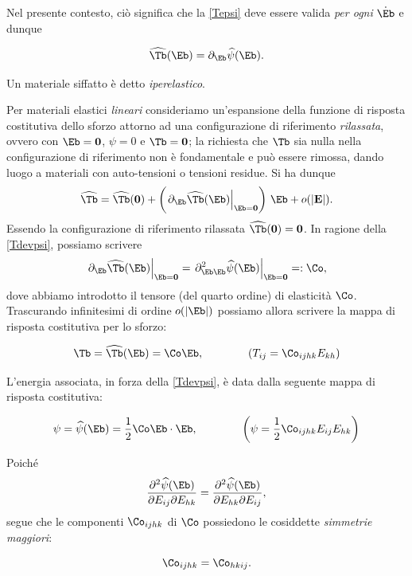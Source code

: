 Nel presente contesto, ciò significa che la \eqref{Tepsi} deve essere valida \textit{per ogni} $\dot{\Eb}$ e dunque 
\begin{definition}
	\begin{equation}\label{Tdevpsi}
\widehat{\Tb}(\Eb)=\partial_\Eb\widehat{\psi}(\Eb).
\end{equation}
\end{definition}
Un materiale siffatto è detto \textit{iperelastico}.

Per materiali elastici \textit{lineari} consideriamo un'espansione della funzione di risposta costitutiva dello sforzo attorno ad una configurazione di riferimento \textit{rilassata}, ovvero con $\Eb=\mathbf{0}$, $\psi=0$ e $\Tb=\mathbf{0}$; la richiesta che $\Tb$ sia nulla nella configurazione di riferimento non è fondamentale e può essere rimossa, dando luogo a materiali con auto-tensioni o tensioni residue. Si ha dunque
\begin{equation}
\widehat{\Tb}=\widehat{\Tb}(\mathbf{0})+\left(\left.\partial_\Eb\widehat{\Tb}(\Eb)\right|_{\Eb=\mathbf{0}}\right)\,\Eb +o(|\mathbf{E}|).
\end{equation}
Essendo la configurazione di riferimento rilassata $\widehat{\Tb}(\mathbf{0})=\mathbf{0}$. In ragione della \eqref{Tdevpsi}, possiamo scrivere
\begin{equation}
\left.\partial_\Eb\widehat{\Tb}(\Eb)\right|_{\Eb=\mathbf{0}}=\left.\partial^2_{\Eb \Eb}\widehat{\psi}(\Eb)\right|_{\Eb=\mathbf{0}}=:\Co,
\end{equation}
dove abbiamo introdotto il tensore (del quarto ordine) di elasticità $\Co$. Trascurando infinitesimi di ordine $o(|\Eb|)$ possiamo allora scrivere la mappa di risposta costitutiva per lo sforzo:
\begin{definition}
	\begin{equation}
\Tb =\widehat{\Tb}(\Eb)=\Co \Eb, \qquad \qquad(T_{ij}=\Co_{ijhk}E_{kh})
\end{equation}
\end{definition}
L'energia associata, in forza della  \eqref{Tdevpsi}, è data dalla seguente mappa di risposta costitutiva:
\begin{definition}
	\begin{equation}
\psi =\widehat{\psi}(\Eb)=\frac{1}{2}\Co \Eb\cdot\Eb, \qquad\qquad  \left(\psi=\frac{1}{2} \Co_{ijhk}E_{ij}E_{hk}  \right)
\end{equation}
\end{definition}

Poiché 
\begin{equation}
	\frac{\partial^2\widehat{\psi}(\Eb)}{\partial E_{ij}\partial E_{hk}}=\frac{\partial^2\widehat{\psi}(\Eb)}{\partial E_{hk}\partial E_{ij}},
\end{equation}
segue che le componenti $\Co_{ijhk}$ di $\Co$ possiedono le cosiddette \textit{simmetrie maggiori}:
\begin{definition}
\begin{equation}
	\Co_{ijhk}=\Co_{hkij}.
\end{equation}
\end{definition}

